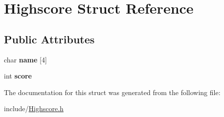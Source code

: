 \hypertarget{structHighscore}{}\section{Highscore Struct Reference}
\label{structHighscore}
\subsection*{Public Attributes}
\begin{DoxyCompactItemize}
\item 
\hypertarget{structHighscore_a96fca7460bcfe4f8af45d5673d184ee9}{}char {\bfseries name} \mbox{[}4\mbox{]}\label{structHighscore_a96fca7460bcfe4f8af45d5673d184ee9}

\item 
\hypertarget{structHighscore_ac9dae3cd8bbd8b55fd4611203b10e082}{}int {\bfseries score}\label{structHighscore_ac9dae3cd8bbd8b55fd4611203b10e082}

\end{DoxyCompactItemize}


The documentation for this struct was generated from the following file\+:\begin{DoxyCompactItemize}
\item 
include/\hyperlink{Highscore_8h}{Highscore.\+h}\end{DoxyCompactItemize}
